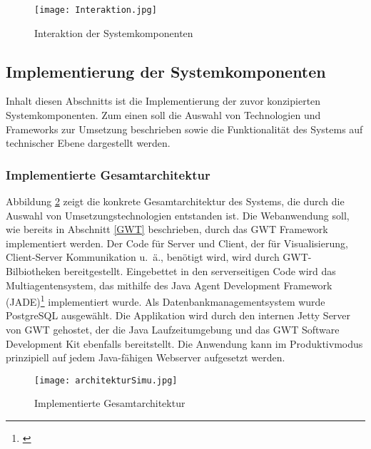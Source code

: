 \begin{figure}[h!]
	\centering
		\texttt{[image: Interaktion.jpg]}        
		\caption{Interaktion der Systemkomponenten}
	\label{Int}
\end{figure}

\newpage
\subsection{Implementierung der Systemkomponenten}
Inhalt diesen Abschnitts ist die Implementierung der zuvor konzipierten Systemkomponenten. Zum einen soll die Auswahl von Technologien und Frameworks zur Umsetzung beschrieben sowie die Funktionalität des Systems auf technischer Ebene dargestellt werden.
\subsubsection{Implementierte Gesamtarchitektur}
Abbildung \ref{GAI} zeigt die konkrete Gesamtarchitektur des Systems, die durch die Auswahl von Umsetzungstechnologien entstanden ist. Die Webanwendung soll, wie bereits in Abschnitt \ref{GWT} beschrieben, durch das GWT Framework implementiert werden. Der Code für Server und Client, der für Visualisierung, Client-Server Kommunikation u.~ä., benötigt wird, wird durch GWT-Bilbiotheken bereitgestellt. Eingebettet in den serverseitigen Code wird das Multiagentensystem, das mithilfe des Java Agent Development Framework (JADE)\footnote{\cite{jade}} implementiert wurde. Als Datenbankmanagementsystem wurde PostgreSQL ausgewählt. Die Applikation wird durch den internen Jetty Server von GWT gehostet, der die Java Laufzeitumgebung und das GWT Software Development Kit ebenfalls bereitstellt. Die Anwendung kann im Produktivmodus prinzipiell auf jedem Java-fähigen Webserver aufgesetzt werden.  
\begin{figure}[h!]
	\centering
		\texttt{[image: architekturSimu.jpg]}        
		\caption{Implementierte Gesamtarchitektur}
	\label{GAI}
\end{figure}
